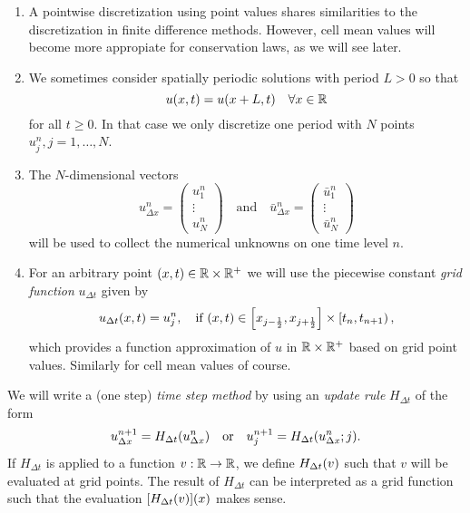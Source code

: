 \begin{remark}
	\begin{enumerate}
		\item A pointwise discretization using point values shares similarities to the discretization in finite difference methods.
		However, cell mean values will become more appropiate for conservation laws, as we will see later.
		\item We sometimes consider spatially periodic solutions with period \(L > 0\) so that
		\[
			u\parentheses*{x, t} = u\parentheses*{x + L, t} \quad \forall x \in \R
		\]
		for all \(t \ge 0\).
		In that case we only discretize one period with \(N\) points \(u_j^n, j = 1, \ldots, N\).
		\item The \(N\)-dimensional vectors
		\[
			u_{\Delta x}^n = \begin{pmatrix}
				u_1^n\\
				\vdots\\
				u_N^n
			\end{pmatrix} \quad \text{and} \quad \bar{u}_{\Delta x}^n = \begin{pmatrix}
				\bar{u}_1^n\\
				\vdots\\
				\bar{u}_N^n
			\end{pmatrix}
		\]
		will be used to collect the numerical unknowns on one time level \(n\).
		\item For an arbitrary point \(\parentheses*{x, t} \in \R \times \R^+\) we will use the piecewise constant \emph{grid function} \(u_{\Delta t}\) given by
		\[
			u_{\Delta t}\parentheses*{x, t} = u_j^n, \quad \text{if }\parentheses*{x, t} \in \brackets*{x_{j - \frac{1}{2}}, x_{j + \frac{1}{2}}} \times \left[t_n, t_{n + 1}\right),
		\]
		which provides a function approximation of \(u\) in \(\R \times \R^+\) based on grid point values.
		Similarly for cell mean values of course.
	\end{enumerate}
\end{remark}

\begin{definition}
	We will write a (one step) \emph{time step method} by using an \emph{update rule} \(H_{\Delta t}\) of the form
	\[
		u_{\Delta x}^{n + 1} = H_{\Delta t}\parentheses*{u_{\Delta x}^n} \quad \text{or} \quad u_j^{n + 1} = H_{\Delta t}\parentheses*{u_{\Delta x}^n; j}.
	\]
	If \(H_{\Delta t}\) is applied to a function \(v: \R \to \R\), we define \(H_{\Delta t}\parentheses*{v}\) such that \(v\) will be evaluated at grid points.
	The result of \(H_{\Delta t}\) can be interpreted as a grid function such that the evaluation \(\brackets*{H_{\Delta t}\parentheses*{v}}\parentheses*{x}\) makes sense.
\end{definition}

